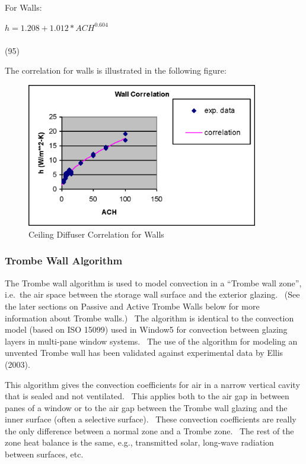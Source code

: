 For Walls:

\(h = 1.208 + 1.012 * AC{H^{0.604}}\) ~~~~~~~~~~~~~~~~~~~~~~~~~~~~~~~~~~~~~~~~~~~~~~~~~~~~~~~~~~~~~~~~~~~~~ (95)

The correlation for walls is illustrated in the following figure:

\begin{figure}[hbtp] %
\centering
\includegraphics[width=0.9\textwidth, height=0.9\textheight, keepaspectratio=true]{media/image382.png}
\caption{Ceiling Diffuser Correlation for Walls \protect \label{fig:ceiling-diffuser-correlation-for-walls}}
\end{figure}

\subsubsection{Trombe Wall Algorithm}\label{trombe-wall-algorithm}

The Trombe wall algorithm is used to model convection in a ``Trombe wall zone'', i.e.~the air space between the storage wall surface and the exterior glazing.~ (See the later sections on Passive and Active Trombe Walls below for more information about Trombe walls.)~ The algorithm is identical to the convection model (based on ISO 15099) used in Window5 for convection between glazing layers in multi-pane window systems.~ The use of the algorithm for modeling an unvented Trombe wall has been validated against experimental data by Ellis (2003).

This algorithm gives the convection coefficients for air in a narrow vertical cavity that is sealed and not ventilated.~ This applies both to the air gap in between panes of a window or to the air gap between the Trombe wall glazing and the inner surface (often a selective surface).~ These convection coefficients are really the only difference between a normal zone and a Trombe zone.~ The rest of the zone heat balance is the same, e.g., transmitted solar, long-wave radiation between surfaces, etc.

